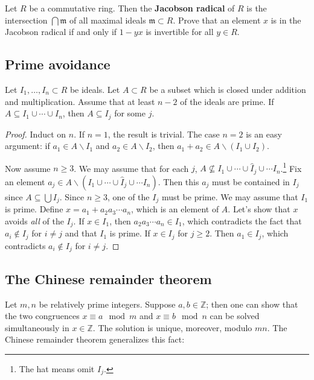 \begin{exercise}\label{Jacobson} 
Let $R$ be a commutative ring. Then the \textbf{Jacobson radical} of $R$ is
the intersection $\bigcap \mathfrak{m}$ of all maximal ideals $\mathfrak{m}
\subset R$. Prove that an element $x$ is in the Jacobson radical if and only
if $1 - yx$ is invertible for all $y \in R$.
\end{exercise} 

\subsection{Prime avoidance}
\begin{theorem} \label{primeavoidance}
   Let $I_1,\dots, I_n \subset R$ be ideals. Let $A\subset R$ be a subset which is closed
   under addition and multiplication. Assume that at least $n-2$ of the ideals are
   prime. If $A\subseteq I_1\cup \cdots \cup I_n$, then $A\subseteq I_j$ for some $j$.
 \end{theorem}
 \begin{proof}
   Induct on $n$. If $n=1$, the result is trivial. The case $n=2$ is an easy argument: if
   $a_1\in A\smallsetminus I_1$ and $a_2\in A\smallsetminus I_2$, then $a_1+a_2\in
   A\smallsetminus (I_1\cup I_2)$.

   Now assume $n\ge 3$. We may assume that for each $j$, $A\not\subseteq I_1\cup \cdots
   \cup \hat I_j\cup \cdots I_n$.\footnote{The hat means omit $I_j$.} Fix an element
   $a_j\in A\smallsetminus (I_1\cup \cdots \cup \hat I_j\cup \cdots I_n)$. Then this
   $a_j$ must be contained in $I_j$ since $A\subseteq \bigcup I_j$. Since $n\ge 3$, one
   of the $I_j$ must be prime. We may assume that $I_1$ is prime. Define
   $x=a_1+a_2a_3\cdots a_n$, which is an element of $A$. Let's show that $x$ avoids
   \emph{all} of the $I_j$. If $x\in I_1$, then $a_2a_3\cdots a_n\in I_1$, which
   contradicts the fact that $a_i\not\in I_j$ for $i\neq j$ and that $I_1$ is prime. If
   $x\in I_j$ for $j\ge 2$. Then $a_1\in I_j$, which contradicts $a_i\not\in I_j$ for
   $i\neq j$.
 \end{proof}
\subsection{The Chinese remainder theorem}

Let $m,n$ be relatively prime integers. Suppose $a, b \in \mathbb{Z}$; then
one can show that the two congruences $x \equiv a \mod m$
and $x \equiv b \mod n$ can be solved simultaneously in $x \in \mathbb{Z}$.
The solution is unique, moreover, modulo $mn$.
The Chinese remainder theorem generalizes this fact:


